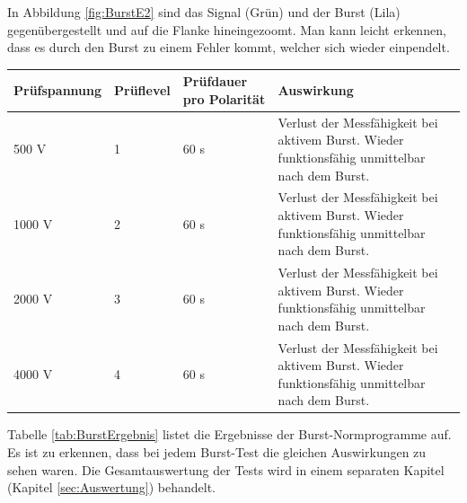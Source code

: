 In Abbildung \ref{fig:BurstE2} sind das Signal (Grün) und der Burst (Lila) gegenübergestellt und auf die Flanke hineingezoomt. Man kann leicht erkennen, dass es durch den Burst zu einem Fehler kommt, welcher sich wieder einpendelt.\\
[0.5cm]
\begin{tabular}{|l|l|l|p{5cm}|}
\hline 
\rule[-1ex]{0pt}{2.5ex} Prüfspannung & Prüflevel & Prüfdauer pro Polarität & Auswirkung \\ 
\hline 
\rule[-1ex]{0pt}{2.5ex} 500 V & 1 & 60 s & Verlust der Messfähigkeit bei aktivem Burst. Wieder funktionsfähig unmittelbar nach dem Burst. \\ 
\hline 
\rule[-1ex]{0pt}{2.5ex} 1000 V & 2 & 60 s & Verlust der Messfähigkeit bei aktivem Burst. Wieder funktionsfähig unmittelbar nach dem Burst. \\ 
\hline 
\rule[-1ex]{0pt}{2.5ex} 2000 V & 3 & 60 s & Verlust der Messfähigkeit bei aktivem Burst. Wieder funktionsfähig unmittelbar nach dem Burst. \\ 
\hline 
\rule[-1ex]{0pt}{2.5ex} 4000 V & 4 & 60 s & Verlust der Messfähigkeit bei aktivem Burst. Wieder funktionsfähig unmittelbar nach dem Burst. \\ 
\hline 
\end{tabular} 
\label{tab:BurstErgebnis}
\vspace*{0.25cm}
Tabelle \ref{tab:BurstErgebnis} listet die Ergebnisse der Burst-Normprogramme auf. Es ist zu erkennen, dass bei jedem Burst-Test die gleichen Auswirkungen zu sehen waren. Die Gesamtauswertung der Tests wird in einem separaten Kapitel (Kapitel \ref{sec:Auswertung}) behandelt.\\

